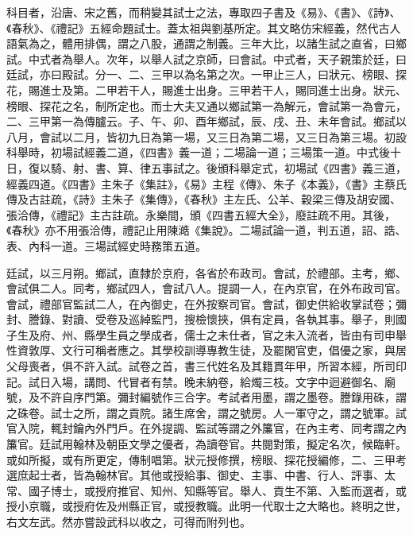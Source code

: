 科目者，沿唐、宋之舊，而稍變其試士之法，專取四子書及《易》、《書》、《詩》、《春秋》、《禮記》五經命題試士。蓋太祖與劉基所定。其文略仿宋經義，然代古人語氣為之，體用排偶，謂之八股，通謂之制義。三年大比，以諸生試之直省，曰鄉試。中式者為舉人。次年，以舉人試之京師，曰會試。中式者，天子親策於廷，曰廷試，亦曰殿試。分一、二、三甲以為名第之次。一甲止三人，曰狀元、榜眼、探花，賜進士及第。二甲若干人，賜進士出身。三甲若干人，賜同進士出身。狀元、榜眼、探花之名，制所定也。而士大夫又通以鄉試第一為解元，會試第一為會元，二、三甲第一為傳臚云。子、午、卯、酉年鄉試，辰、戌、丑、未年會試。鄉試以八月，會試以二月，皆初九日為第一場，又三日為第二場，又三日為第三場。初設科舉時，初場試經義二道，《四書》義一道；二場論一道；三場策一道。中式後十日，復以騎、射、書、算、律五事試之。後頒科舉定式，初場試《四書》義三道，經義四道。《四書》主朱子《集註》，《易》主程《傳》、朱子《本義》，《書》主蔡氏傳及古註疏，《詩》主朱子《集傳》，《春秋》主左氏、公羊、穀梁三傳及胡安國、張洽傳，《禮記》主古註疏。永樂間，頒《四書五經大全》，廢註疏不用。其後，《春秋》亦不用張洽傳，禮記止用陳澔《集說》。二場試論一道，判五道，詔、誥、表、內科一道。三場試經史時務策五道。

廷試，以三月朔。鄉試，直隸於京府，各省於布政司。會試，於禮部。主考，鄉、會試俱二人。同考，鄉試四人，會試八人。提調一人，在內京官，在外布政司官。會試，禮部官監試二人，在內御史，在外按察司官。會試，御史供給收掌試卷；彌封、謄錄、對讀、受卷及巡綽監門，搜檢懷挾，俱有定員，各執其事。舉子，則國子生及府、州、縣學生員之學成者，儒士之未仕者，官之未入流者，皆由有司申舉性資敦厚、文行可稱者應之。其學校訓導專教生徒，及罷閑官吏，倡優之家，與居父母喪者，俱不許入試。試卷之首，書三代姓名及其籍貫年甲，所習本經，所司印記。試日入場，講問、代冒者有禁。晚未納卷，給燭三枝。文字中迴避御名、廟號，及不許自序門第。彌封編號作三合字。考試者用墨，謂之墨卷。謄錄用硃，謂之硃卷。試士之所，謂之貢院。諸生席舍，謂之號房。人一軍守之，謂之號軍。試官入院，輒封鑰內外門戶。在外提調、監試等謂之外簾官，在內主考、同考謂之內簾官。廷試用翰林及朝臣文學之優者，為讀卷官。共閱對策，擬定名次，候臨軒。或如所擬，或有所更定，傳制唱第。狀元授修撰，榜眼、探花授編修，二、三甲考選庶起士者，皆為翰林官。其他或授給事、御史、主事、中書、行人、評事、太常、國子博士，或授府推官、知州、知縣等官。舉人、貢生不第、入監而選者，或授小京職，或授府佐及州縣正官，或授教職。此明一代取士之大略也。終明之世，右文左武。然亦嘗設武科以收之，可得而附列也。

